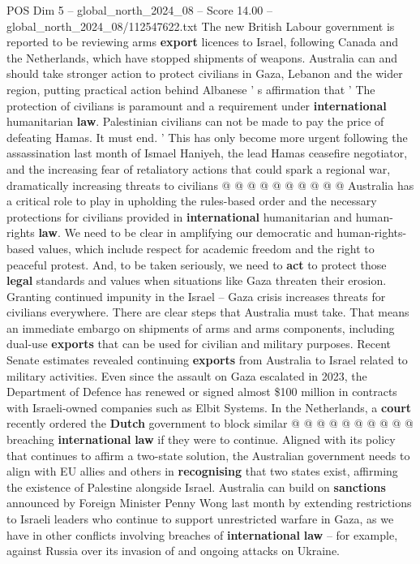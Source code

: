 \begin{textsample}{POS Dim 5 – global\_north\_2024\_08 – Score 14.00 – global\_north\_2024\_08/112547622.txt}
The new British Labour government is reported to be reviewing arms \textbf{export} licences to Israel, following Canada and the Netherlands, which have stopped shipments of weapons.
Australia can and should take stronger action to protect civilians in Gaza, Lebanon and the wider region, putting practical action behind Albanese ' s affirmation that ' The protection of civilians is paramount and a requirement under \textbf{international} humanitarian \textbf{law}.
Palestinian civilians can not be made to pay the price of defeating Hamas.
It must end. ' This has only become more urgent following the assassination last month of Ismael Haniyeh, the lead Hamas ceasefire negotiator, and the increasing fear of retaliatory actions that could spark a regional war, dramatically increasing threats to civilians @ @ @ @ @ @ @ @ @ @ Australia has a critical role to play in upholding the rules-based order and the necessary protections for civilians provided in \textbf{international} humanitarian and human-rights \textbf{law}.
We need to be clear in amplifying our democratic and human-rights-based values, which include respect for academic freedom and the right to peaceful protest.
And, to be taken seriously, we need to \textbf{act} to protect those \textbf{legal} standards and values when situations like Gaza threaten their erosion.
Granting continued impunity in the Israel -- Gaza crisis increases threats for civilians everywhere.
There are clear steps that Australia must take.
That means an immediate embargo on shipments of arms and arms components, including dual-use \textbf{exports} that can be used for civilian and military purposes.
Recent Senate estimates revealed continuing \textbf{exports} from Australia to Israel related to military activities.
Even since the assault on Gaza escalated in 2023, the Department of Defence has renewed or signed almost \$100 million in contracts with Israeli-owned companies such as Elbit Systems.
In the Netherlands, a \textbf{court} recently ordered the \textbf{Dutch} government to block similar @ @ @ @ @ @ @ @ @ @ breaching \textbf{international} \textbf{law} if they were to continue.
Aligned with its policy that continues to affirm a two-state solution, the Australian government needs to align with EU allies and others in \textbf{recognising} that two states exist, affirming the existence of Palestine alongside Israel.
Australia can build on \textbf{sanctions} announced by Foreign Minister Penny Wong last month by extending restrictions to Israeli leaders who continue to support unrestricted warfare in Gaza, as we have in other conflicts involving breaches of \textbf{international} \textbf{law} -- for example, against Russia over its invasion of and ongoing attacks on Ukraine.

\end{textsample}

